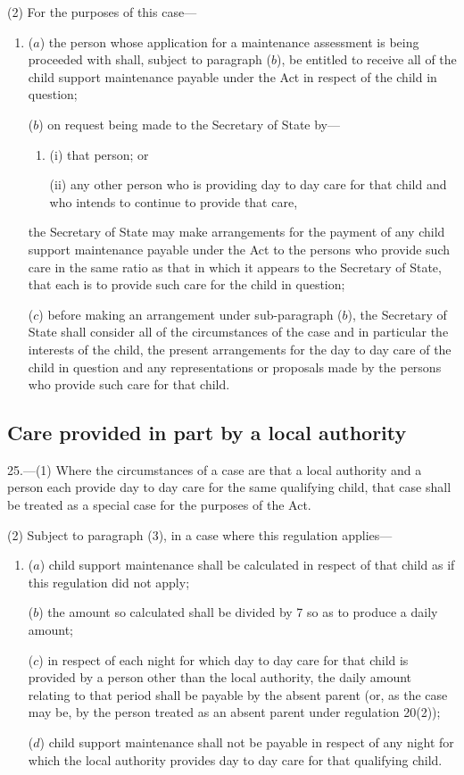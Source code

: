 \documentclass[12pt,a4paper]{article}
\begin{document}
(2) For the purposes of this case—
\begin{enumerate}\item[]
($a$) the person whose application for a maintenance assessment is being proceeded with shall, subject to paragraph ($b$), be entitled to receive all of the child support maintenance payable under the Act in respect of the child in question;

($b$) on request being made to the Secretary of State by—
\begin{enumerate}\item[]
(i) that person; or

(ii) any other person who is providing day to day care for that child and who intends to continue to provide that care,
\end{enumerate}
the Secretary of State may make arrangements for the payment of any child support maintenance payable under the Act to the persons who provide such care in the same ratio as that in which it appears to the Secretary of State, that each is to provide such care for the child in question;

($c$) before making an arrangement under sub-paragraph ($b$), the Secretary of State shall consider all of the circumstances of the case and in particular the interests of the child, the present arrangements for the day to day care of the child in question and any representations or proposals made by the persons who provide such care for that child.
\end{enumerate}

\subsection[25. Care provided in part by a local authority]{Care provided in part by a local authority}

25.—(1) Where the circumstances of a case are that a local authority and a person each provide day to day care for the same qualifying child, that case shall be treated as a special case for the purposes of the Act.

(2) 
Subject to paragraph (3), in a case where this regulation applies---  %
\begin{enumerate}\item[]
($a$) child support maintenance shall be calculated in respect of that child as if this regulation did not apply;

($b$) the amount so calculated shall be divided by 7 so as to produce a daily amount;

($c$) in respect of each night for which day to day care for that child is provided by a person other than the local authority, the daily amount relating to that period shall be payable by the absent parent (or, as the case may be, by the person treated as an absent parent under regulation 20(2));

($d$) child support maintenance shall not be payable in respect of any night for which the local authority provides day to day care for that qualifying child.
\end{enumerate}
\end{document}
